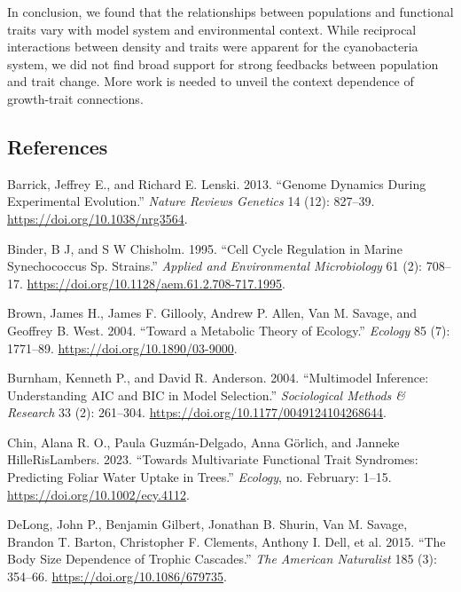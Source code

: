 \documentclass[
  letterpaper,
  DIV=11,
  numbers=noendperiod]{scrartcl}
\newlength{\cslhangindent}
\newenvironment{CSLReferences}[2] %
 {\begin{list}{}{%
  \setlength{\itemindent}{0pt}
  \setlength{\leftmargin}{0pt}
  \setlength{\parsep}{0pt}
  \ifodd #1
   \setlength{\leftmargin}{\cslhangindent}
   \setlength{\itemindent}{-1\cslhangindent}
  \fi
  \setlength{\itemsep}{#2\baselineskip}}}
 {\end{list}}
\begin{document}
In conclusion, we found that the relationships between populations and
functional traits vary with model system and environmental context.
While reciprocal interactions between density and traits were apparent
for the cyanobacteria system, we did not find broad support for strong
feedbacks between population and trait change. More work is needed to
unveil the context dependence of growth-trait connections.

\subsection{References}\label{references}

\label{refs}
\begin{CSLReferences}{1}{0}
Barrick, Jeffrey E., and Richard E. Lenski. 2013. {``Genome Dynamics
During Experimental Evolution.''} \emph{Nature Reviews Genetics} 14
(12): 827--39. \url{https://doi.org/10.1038/nrg3564}.

Binder, B J, and S W Chisholm. 1995. {``Cell {Cycle Regulation} in
{Marine Synechococcus} Sp. {Strains}.''} \emph{Applied and Environmental
Microbiology} 61 (2): 708--17.
\url{https://doi.org/10.1128/aem.61.2.708-717.1995}.

Brown, James H., James F. Gillooly, Andrew P. Allen, Van M. Savage, and
Geoffrey B. West. 2004. {``Toward a {Metabolic Theory} of {Ecology}.''}
\emph{Ecology} 85 (7): 1771--89. \url{https://doi.org/10.1890/03-9000}.

Burnham, Kenneth P., and David R. Anderson. 2004. {``Multimodel
{Inference}: {Understanding AIC} and {BIC} in {Model Selection}.''}
\emph{Sociological Methods \& Research} 33 (2): 261--304.
\url{https://doi.org/10.1177/0049124104268644}.

Chin, Alana R. O., Paula Guzmán-Delgado, Anna Görlich, and Janneke
HilleRisLambers. 2023. {``Towards Multivariate Functional Trait
Syndromes: {Predicting} Foliar Water Uptake in Trees.''} \emph{Ecology},
no. February: 1--15. \url{https://doi.org/10.1002/ecy.4112}.

DeLong, John P., Benjamin Gilbert, Jonathan B. Shurin, Van M. Savage,
Brandon T. Barton, Christopher F. Clements, Anthony I. Dell, et al.
2015. {``The {Body Size Dependence} of {Trophic Cascades}.''} \emph{The
American Naturalist} 185 (3): 354--66.
\url{https://doi.org/10.1086/679735}.


\end{CSLReferences}
\end{document}
